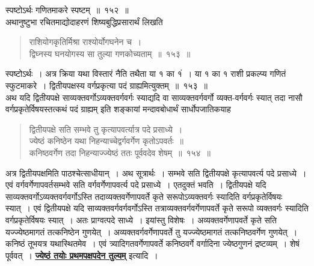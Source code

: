 \documentclass[11pt, openany]{book}
\begin{document}
स्पष्टोऽर्थः गणितमाकरे स्पष्टम्~॥~१५२~॥~\\

\vspace{-2mm}
 अथानुष्टुभा रचितमाद्योदाहरणं शिष्यबुद्धिप्रसारार्थं लिखति\textendash
\begin{quote}
    \eg 
     राशियोगकृतिर्मिश्रा राश्योर्योगघनेन च~। \\
 द्विघ्नस्य घनयोगस्य सा तुल्या गणकोच्यताम्~॥~१५३~॥~
\end{quote}
 
 स्पष्टोऽर्थः~। अत्र क्रिया यथा विस्तारं नैति तथैता या १ का १ं~। या
 १ का १ राशी प्रकल्प्य गणितं स्फुटमाकरे~। द्वितीयपक्षस्य वर्गप्रकृत्या
पदं ग्राह्यमित्युक्तम्~॥~१५३~॥~\\

\vspace{-2mm}
 अथ यदि द्वितीयपक्षे साव्यक्तवर्गोऽव्यक्तवर्गवर्गः स्याद्यदि वा
साव्यक्तवर्गवर्गो व्यक्त-वर्गवर्गः स्यात् तदा नासौ वर्गप्रकृतेर्विषयस्तत्कथं 
पदं ग्राह्यम् इति शङ्कायां मन्दावबोधार्थं सार्धोपजातिकयाह\textendash

 \label{154}
  \begin{quote}
      \ab 
       द्वितीयपक्षे सति सम्भवे तु कृत्यापवर्त्यात्र पदे प्रसाध्ये~। \\
 ज्येष्ठं कनिष्ठेन यथा निहन्याच्चेद्वर्गवर्गेण कृतोऽपवर्तः~॥~\\
 कनिष्ठवर्गेण तदा निहन्याज्ज्येष्ठं ततः पूर्ववदेव शेषम्~॥~१५४~॥~
  \end{quote}
 
 अत्र द्वितीयपक्षमिति पाठश्चेत्साधीयान्~। अथ सूत्रार्थः~। सम्भवे सति
द्वितीयपक्षे कृत्यापवर्त्य पदे प्रसाध्ये~। एवं
वर्गवर्गेणापवर्तसम्भवे सति
वर्गवर्गेणापवर्त्य पदे प्रसाध्ये~। एतदुक्तं भवति~। द्वितीयपक्षे यदि
साव्यक्तवर्गोऽव्यक्तवर्गवर्गोऽस्ति तदाव्यक्तवर्गेणापवर्ते कृते
सरूपोऽव्यक्तवर्गः स्यादिति वर्गप्रकृतेर्विषयः स्यात्~। एवं द्वितीयपक्षे
यदि साव्यक्तवर्गवर्गवर्गोऽस्ति तत्राव्यक्तवर्गवर्गेणापवर्ते कृते सरूपो व्यक्तवर्गः स्यादिति वर्गप्रकृतेर्विषयः स्यात्~। अतः प्राग्वत्पदे साध्ये~। इयांस्तु विशेषः~।
\newpage
\noindent अव्यक्तवर्गेणापवर्ते कृते सति यज्ज्येष्ठमागतं तत्कनिष्ठेन गुणयेत्~।
अव्यक्तवर्गवर्गेणापवर्ते तु यज्ज्येष्ठमागतं तत्कनिष्ठवर्गेण गुणयेत्~। कनिष्ठं तूभयत्र
यथास्थितमेव~।
एवं त्र्यादिगतवर्गेणापवर्ते कनिष्ठवर्गे वर्गादिना ज्येष्ठगुणनं
द्रष्टव्यम्~। शेषं पूर्ववत्~। \hyperref[151]{\textbf{ज्येष्ठं तयोः प्रथमपक्षपदेन तुल्यम्}} इत्यादि~।\\
\end{document}
